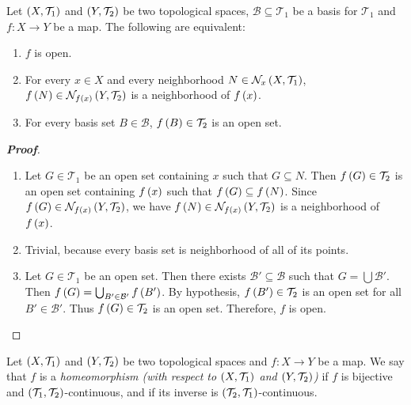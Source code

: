 \begin{proposition}
  Let $\left(X,\mathcal{T}_1\right)$ and $\left(Y,\mathcal{T}_2\right)$ be two topological spaces, $\mathcal{B}\subseteq\mathcal{T}_1$ be a basis for $\mathcal{T}_1$ and $f:X\rightarrow Y$ be a map. The following are equivalent:

  \begin{enumerate}
    \item $f$ is open.
    \item For every $x\in X$ and every neighborhood $N\in\mathcal{N}_x\left(X,\mathcal{T}_1\right)$, $f\left(N\right)\in\mathcal{N}_{f\left(x\right)}\left(Y,\mathcal{T}_2\right)$ is a neighborhood of $f\left(x\right)$.
    \item For every basis set $B\in\mathcal{B}$, $f\left(B\right)\in\mathcal{T}_2$ is an open set.
  \end{enumerate}
  \begin{proof}[\rm\textbf{Proof}]
    \hfill
    \begin{enumerate}
      \item[\boxed{1\Rightarrow2}] Let $G\in\mathcal{T}_1$ be an open set containing $x$ such that $G\subseteq N$. Then $f\left(G\right)\in\mathcal{T}_2$ is an open set containing $f\left(x\right)$ such that $f\left(G\right)\subseteq f\left(N\right)$. Since $f\left(G\right)\in\mathcal{N}_{f\left(x\right)}\left(Y,\mathcal{T}_2\right)$, we have $f\left(N\right)\in\mathcal{N}_{f\left(x\right)}\left(Y,\mathcal{T}_2\right)$ is a neighborhood of $f\left(x\right)$. 
      \item[\boxed{2\Rightarrow3}] Trivial, because every basis set is neighborhood of all of its points.
      \item[\boxed{3\Rightarrow1}] Let $G\in\mathcal{T}_1$ be an open set. Then there exists $\mathcal{B}'\subseteq\mathcal{B}$ such that $G=\bigcup{\mathcal{B}'}$. Then $f\left(G\right)=\bigcup_{B'\in\mathcal{B}'}{f\left(B'\right)}$. By hypothesis, $f\left(B'\right)\in\mathcal{T}_2$ is an open set for all $B'\in\mathcal{B}'$. Thus $f\left(G\right)\in\mathcal{T}_2$ is an open set. Therefore, $f$ is open.
    \end{enumerate}
  \end{proof}
\end{proposition}

\begin{definition}
  Let $\left(X,\mathcal{T}_1\right)$ and $\left(Y,\mathcal{T}_2\right)$ be two topological spaces and $f:X\rightarrow Y$ be a map. We say that $f$ is a \textit{homeomorphism (with respect to $\left(X,\mathcal{T}_1\right)$ and $\left(Y,\mathcal{T}_2\right)$)} if $f$ is bijective and $\left(\mathcal{T}_1,\mathcal{T}_2\right)$-continuous, and if its inverse is $\left(\mathcal{T}_2,\mathcal{T}_1\right)$-continuous.
\end{definition}

